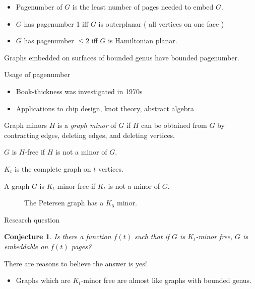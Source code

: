 \documentclass[Frankfurt]{beamer}
\newtheorem{conjecture}[theorem]{Conjecture}
\begin{document}
\begin{frame}
	\begin{itemize}
		\item Pagenumber of $G$ is the least number of pages needed to embed $G$.
		\item $G$ has pagenumber 1 iff $G$ is outerplanar ( all vertices on one face )
		\item $G$ has pagenumber $\leq 2$ iff $G$ is Hamiltonian planar.
	\end{itemize}

	\begin{theorem}
		Graphs embedded on surfaces of bounded genus have bounded pagenumber.
	\end{theorem}
\end{frame}

\begin{frame}{Usage of pagenumber}
	\begin{itemize}
		\item Book-thickness was investigated in 1970s
		\item Applications to chip design, knot theory, abstract algebra
	\end{itemize}
\end{frame}

\begin{frame}{Graph minors}
	$H$ is a \textit{graph minor} of $G$ if $H$ can be obtained from $G$ by contracting edges, deleting edges, and deleting vertices.
	
	$G$ is $H$-free if $H$ is not a minor of $G$. 
\end{frame}

\begin{frame}
	$K_t$ is the complete graph on $t$ vertices.
	\begin{definition}
		A graph $G$ is $K_t$-minor free if $K_t$ is not a minor of $G$.
	\end{definition}
	\begin{figure}[h]
		\centering
		
		
		\caption{The Petersen graph has a $K_5$ minor.}\label{P10contraction}
	\end{figure}
\end{frame}

\begin{frame}{Research question}
	\begin{conjecture}
		Is there a function $f(t)$ such that if $G$ is $K_t$-minor free, $G$ is embeddable on $f(t)$ pages?
	\end{conjecture}
	There are reasons to believe the answer is yes!
	\begin{itemize}
		\item Graphs which are $K_t$-minor free are almost like graphs with bounded genus.
	\end{itemize}
\end{frame}
\end{document}
